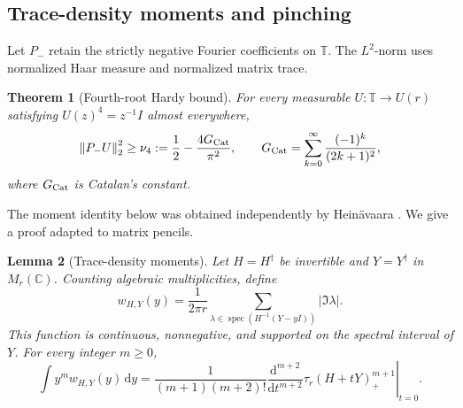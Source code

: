 \documentclass[11pt]{amsart}
\newtheorem{theorem}{Theorem}[section]
\newtheorem{lemma}[theorem]{Lemma}
\theoremstyle{remark}
\theoremstyle{plain}
\numberwithin{equation}{section}
\DeclareMathOperator{\spec}{spec}
\newcommand{\C}{\mathbb C}
\newcommand{\dd}{\,\mathrm d}
\newcommand{\norm}[1]{\left\|#1\right\|}
\newcommand{\Gc}{G_{\rm Cat}}
\begin{document}
\subsection{Trace-density moments and pinching}

Let \(P_-\) retain the strictly negative Fourier coefficients on
\(\mathbb T\). The \(L^2\)-norm uses normalized Haar measure and
normalized matrix trace.

\begin{theorem}[Fourth-root Hardy bound]\label{thm:hardy}
For every measurable \(U:\mathbb T\to U(r)\) satisfying
\(U(z)^4=z^{-1}I\) almost everywhere,
\begin{equation}\label{eq:Hardy}
 \norm{P_-U}_2^2\ge
 \nu_4:=\frac12-\frac{4\Gc}{\pi^2},\qquad
 \Gc=\sum_{k=0}^\infty\frac{(-1)^k}{(2k+1)^2},
\end{equation}
where \(\Gc\) is Catalan's constant.
\end{theorem}

The moment identity below was obtained independently by
Heinävaara \cite[Lemma 2.5, equation (16)]{Heinavaara}.
We give a proof adapted to matrix pencils.

\begin{lemma}[Trace-density moments]\label{lem:density}
Let \(H=H^\dagger\) be invertible and \(Y=Y^\dagger\) in \(M_r(\C)\).
Counting algebraic multiplicities, define
\[
 w_{H,Y}(y)=\frac1{2\pi r}
 \sum_{\lambda\in\spec(H^{-1}(Y-yI))}|\Im\lambda|.
\]
This function is continuous, nonnegative, and supported on the spectral
interval of \(Y\). For every integer \(m\ge0\),
\begin{equation}\label{eq:densitymoments}
 \int y^m w_{H,Y}(y)\dd y
 =\frac1{(m+1)(m+2)!}
 \left.\frac{\mathrm d^{m+2}}{\mathrm dt^{m+2}}
           \tau_r(H+tY)_+^{m+1}\right|_{t=0}.
\end{equation}
\end{lemma}
\end{document}
